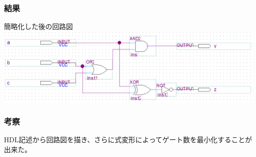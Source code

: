 \documentclass[a4paper]{jarticle}
\begin{document}
\subsubsection{結果}
\begin{center}
	簡略化した後の回路図
	\includegraphics[width=15cm]{2-l-2.PNG}
\end{center}
\subsubsection{考察}
HDL記述から回路図を描き、さらに式変形によってゲート数を最小化することが出来た。
\end{document}
